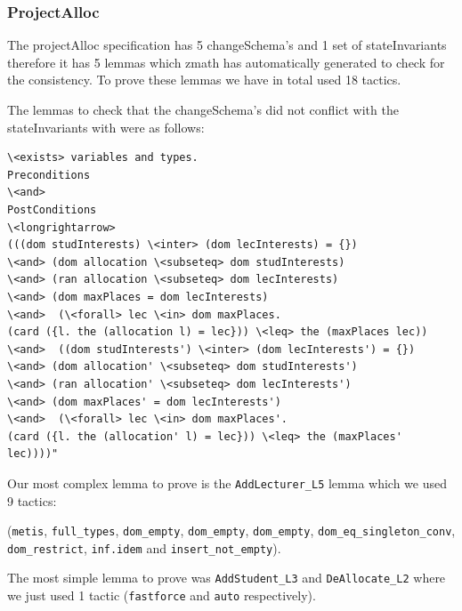 
\subsubsection{ProjectAlloc}

The projectAlloc specification \cite{mathlangexamples} has 5 changeSchema's and 1 set of stateInvariants
therefore it has 5 lemmas which \gls{zmath} has automatically generated to check
for the consistency. To prove these lemmas we have in total used 18 tactics.

The lemmas to check that the changeSchema's did not conflict with
the stateInvariants with were as follows:

\begin{verbatim}
\<exists> variables and types.
Preconditions
\<and>
PostConditions
\<longrightarrow>
(((dom studInterests) \<inter> (dom lecInterests) = {})
\<and> (dom allocation \<subseteq> dom studInterests)
\<and> (ran allocation \<subseteq> dom lecInterests)
\<and> (dom maxPlaces = dom lecInterests)
\<and>  (\<forall> lec \<in> dom maxPlaces.
(card ({l. the (allocation l) = lec})) \<leq> the (maxPlaces lec))
\<and>  ((dom studInterests') \<inter> (dom lecInterests') = {})
\<and> (dom allocation' \<subseteq> dom studInterests')
\<and> (ran allocation' \<subseteq> dom lecInterests')
\<and> (dom maxPlaces' = dom lecInterests')
\<and>  (\<forall> lec \<in> dom maxPlaces'.
(card ({l. the (allocation' l) = lec})) \<leq> the (maxPlaces' lec))))"
\end{verbatim}

Our most complex lemma to prove is the \verb|AddLecturer_L5| lemma which we used
9 tactics:

(\verb|metis|, \verb|full_types|, \verb|dom_empty|, \verb|dom_empty|,
\verb|dom_empty|, \verb|dom_eq_singleton_conv|, \verb|dom_restrict|,
\verb|inf.idem| and \verb|insert_not_empty|).

The most simple lemma to prove was \verb|AddStudent_L3| and \verb|DeAllocate_L2|
where we just used 1 tactic (\verb|fastforce| and \verb|auto| respectively).

